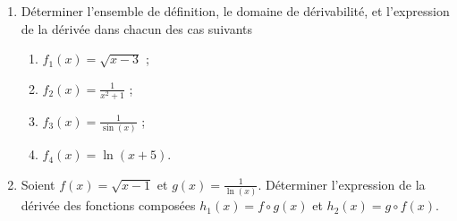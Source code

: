 
\begin{exercice}\label{exostarterST-0016}


\begin{enumerate}
\item Déterminer l'ensemble de définition, le domaine de dérivabilité, et l'expression de la dérivée dans chacun des cas suivants 
  \begin{multicols}{2}
    \begin{enumerate}
    \item $f_1(x) = \sqrt{x-3}$ ; 
    \item $f_2(x) = \frac{1}{x^2+1}$ ; 
    \item $f_3(x) = \frac{1}{\sin(x)}$ ;
    \item $f_4(x) = \ln(x+5)$.  
    \end{enumerate}
  \end{multicols}
\item  Soient $f(x)= \sqrt{x-1}$ et $\displaystyle g(x)=\frac{1}{\ln(x)}$. Déterminer l'expression de la dérivée des fonctions composées $h_1 (x) = f\circ g (x)$ et $h_2(x)=g\circ f (x)$.
\end{enumerate}

\end{exercice}
